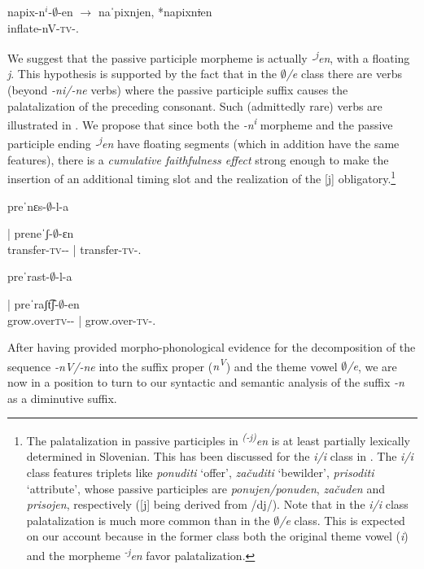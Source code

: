 \documentclass[output=paper,colorlinks,citecolor=brown]{langscibook}
\begin{document}
\ex
	
 \gll napix-n$^i$-$∅$-en $→$ naˈpixnjen, *napixn\sout{i}en \\
 inflate-nV-\textsc{tv}-{\PASS.\PTCP}\\ \label{str:ex:mah}
\z

\noindent We suggest that the passive participle morpheme is actually \textit{-\textsuperscript{j}en}, with a floating \textit{j}. This hypothesis is supported by the fact that in the \textit{$∅$/e} class there are verbs (beyond \textit{-ni/-ne} verbs) where the passive participle suffix causes the palatalization of the preceding consonant. Such (admittedly rare) verbs are illustrated in . We propose that since both the \textit{-n\textsuperscript{i}} morpheme and the passive participle ending \textit{-\textsuperscript{j}en} have floating segments (which in addition have the same features), there is a \textit{cumulative faithfulness effect} \citep{FarrisTrimble2008} strong enough to make the insertion of an additional timing slot and the realization of the [j] obligatory.\footnote{The palatalization in passive participles in \textit{\textsuperscript{(-j)}en} is at least partially lexically determined in Slovenian. This has been discussed for the \textit{i/i} class in \citet{sta+:Toporisic2000}. The \textit{i/i} class features triplets like \textit{ponuditi} `offer', \textit{začuditi} `bewilder', \textit{prisoditi} `attribute', whose passive participles are \textit{ponujen/ponuden}, \textit{začuden} and \textit{prisojen}, respectively ([j] being derived from /dj/). Note that in the \textit{i/i} class palatalization is much more common than in the \textit{$∅$/e} class. This is expected on our account because in the former class both the original theme vowel (\textit{i}) and the morpheme \textit{\textsuperscript{-j}en} favor palatalization.} 

\ea\label{str:ex:pas4}
	\ea \gll \parbox{3.5cm}{preˈnɛs-$∅$-l-a} | preneˈʃ-$∅$-ɛn\\ 
transfer-\textsc{tv}-{\PST-\FEM} | transfer-\textsc{tv}-{\PASS.\PTCP}\\ \label{str:ex:pas4-a}

\ex \gll \parbox{3.5cm}{preˈrast-$∅$-l-a} | preˈraʃt͡ʃ-$∅$-en\\ 
grow.over\textsc{tv}-{\PST-\FEM} | grow.over-\textsc{tv}-{\PASS.\PTCP}\\ \label{str:ex:pas4-b}

\z
\z

\noindent After having provided morpho-phonological evidence for the decomposition of the sequence \textit{-nV/-ne} into the suffix proper (\textit{n\textsuperscript{V}}) and the theme vowel \textit{$∅$/e}, we are now in a position to turn to our syntactic and semantic analysis of the suffix \textit{-n} as a diminutive suffix.
\end{document}
